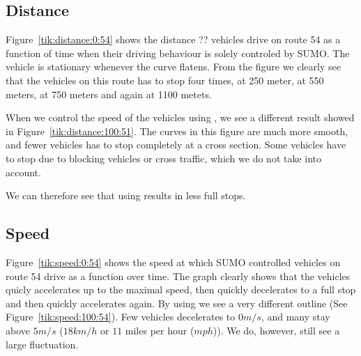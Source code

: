 %
%

\begin{comment}
\begin{figure}
\begin{tikzpicture}[scale=1.3]
\begin{axis}[xlabel=Routes,xticklabel=\empty,ylabel=Fuel consumption,bar width=1pt,]
\addplot[ybar, blue] table[x=Route,y=Fuel] {TestResults/0/avg.dat};
\addplot[ybar, red] table[x=Route,y=Fuel] {TestResults/100/avg.dat};
\draw[thick, red] (axis cs:0,138) -- (axis cs:109,138);
\draw[thick, blue] (axis cs:0,162) -- (axis cs:109,162);
\end{axis}
\end{tikzpicture}
\caption{Average fuel consumption with (red) and without \tech (blue)}\label{tik:fuel:avg}
\end{figure}
\end{comment}


\subsection{Distance}
Figure~\ref{tik:distance:0:54} shows the distance ?? vehicles drive on route 54 as a function of time when their driving behaviour is solely controled by SUMO. 
The vehicle is stationary whenever the curve flatens.
From the figure we clearly see that the vehicles on this route has to stop four times, at 250 meter, at 550 meters, at 750 meters and again at 1100 metets.

When we control the speed of the vehicles using \tech, we see a different result showed in Figure~\ref{tik:distance:100:51}.
The curves in this figure are much more smooth, and fewer vehicles has to stop completely at a cross section.
Some vehicles have to stop due to blocking vehicles or cross traffic, which we do not take into account.

We can therefore see that using \tech results in less full stops.

%

\subsection{Speed}
Figure~\ref{tik:speed:0:54} shows the speed at which SUMO controlled vehicles on route 54 drive as a function over time.
The graph clearly shows that the vehicles quicly accelerates up to the maximal speed, then quickly decelerates to a full stop and then quickly accelerates again.
By using \tech we see a very different outline (See Figure~\ref{tik:speed:100:54}).
Few vehicles decelerates to $0 m/s$, and many stay above $5 m/s$ ($18 km/h$ or $11$ miles per hour ($mph$)).
We do, however, still see a large fluctuation.
%


